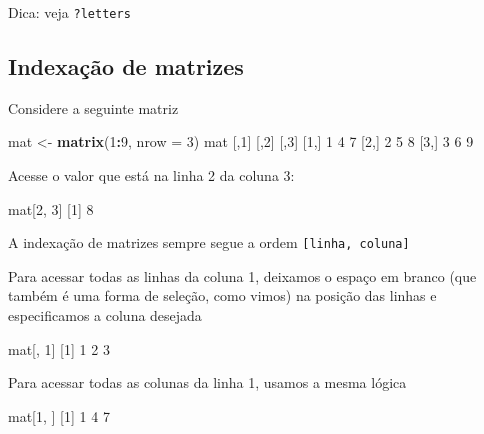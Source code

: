 \documentclass[10pt,a4paper]{book}
\newenvironment{Shaded}{\begin{snugshade}}{\end{snugshade}}
\newcommand{\KeywordTok}[1]{\textcolor[rgb]{0.13,0.29,0.53}{\textbf{#1}}}
\newcommand{\DataTypeTok}[1]{\textcolor[rgb]{0.13,0.29,0.53}{#1}}
\newcommand{\DecValTok}[1]{\textcolor[rgb]{0.00,0.00,0.81}{#1}}
\newcommand{\StringTok}[1]{\textcolor[rgb]{0.31,0.60,0.02}{#1}}
\newcommand{\OperatorTok}[1]{\textcolor[rgb]{0.81,0.36,0.00}{\textbf{#1}}}
\newcommand{\NormalTok}[1]{#1}
\begin{document}
Dica: veja \texttt{?letters}

\subsection{Indexação de matrizes}\label{indexacao-de-matrizes}

Considere a seguinte matriz

\begin{Shaded}
\begin{Highlighting}[]
\NormalTok{mat <-}\StringTok{ }\KeywordTok{matrix}\NormalTok{(}\DecValTok{1}\OperatorTok{:}\DecValTok{9}\NormalTok{, }\DataTypeTok{nrow =} \DecValTok{3}\NormalTok{)}
\NormalTok{mat}
\NormalTok{     [,}\DecValTok{1}\NormalTok{] [,}\DecValTok{2}\NormalTok{] [,}\DecValTok{3}\NormalTok{]}
\NormalTok{[}\DecValTok{1}\NormalTok{,]    }\DecValTok{1}    \DecValTok{4}    \DecValTok{7}
\NormalTok{[}\DecValTok{2}\NormalTok{,]    }\DecValTok{2}    \DecValTok{5}    \DecValTok{8}
\NormalTok{[}\DecValTok{3}\NormalTok{,]    }\DecValTok{3}    \DecValTok{6}    \DecValTok{9}
\end{Highlighting}
\end{Shaded}

Acesse o valor que está na linha 2 da coluna 3:

\begin{Shaded}
\begin{Highlighting}[]
\NormalTok{mat[}\DecValTok{2}\NormalTok{, }\DecValTok{3}\NormalTok{]}
\NormalTok{[}\DecValTok{1}\NormalTok{] }\DecValTok{8}
\end{Highlighting}
\end{Shaded}

A indexação de matrizes sempre segue a ordem
\texttt{{[}linha,\ coluna{]}}

Para acessar todas as linhas da coluna 1, deixamos o espaço em branco
(que também é uma forma de seleção, como vimos) na posição das linhas e
especificamos a coluna desejada

\begin{Shaded}
\begin{Highlighting}[]
\NormalTok{mat[, }\DecValTok{1}\NormalTok{]}
\NormalTok{[}\DecValTok{1}\NormalTok{] }\DecValTok{1} \DecValTok{2} \DecValTok{3}
\end{Highlighting}
\end{Shaded}

Para acessar todas as colunas da linha 1, usamos a mesma lógica

\begin{Shaded}
\begin{Highlighting}[]
\NormalTok{mat[}\DecValTok{1}\NormalTok{, ]}
\NormalTok{[}\DecValTok{1}\NormalTok{] }\DecValTok{1} \DecValTok{4} \DecValTok{7}
\end{Highlighting}
\end{Shaded}
\end{document}
